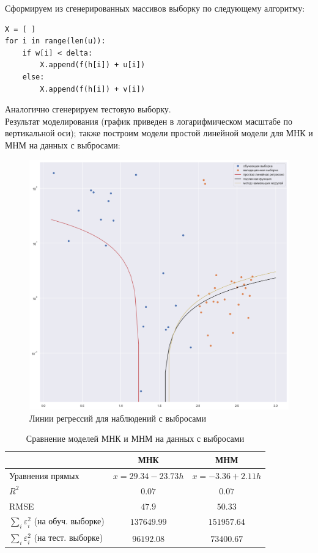 \documentclass[a4paper,12pt]{article}
\begin{document}
Сформируем из сгенерированных массивов выборку по следующему алгоритму:
\begin{verbatim}
X = [ ]
for i in range(len(u)):
    if w[i] < delta:
        X.append(f(h[i]) + u[i])
    else:
        X.append(f(h[i]) + v[i])
\end{verbatim}

Аналогично сгенерируем тестовую выборку.\\
Результат моделирования (график приведен в логарифмическом масштабе по вертикальной оси); также построим модели простой линейной модели для МНК и МНМ на данных с выбросами:

\begin{figure}[H]
    \centering
    \includegraphics[width=0.5\linewidth]{src/img/простая_линейная регрессия_с_выбросами.png}
    \caption{Линии регрессий для наблюдений с выбросами}
\end{figure}

\begin{table}[H]
    \begin{center}
        \begin{tabular}{|l|c|c|}
            \hline
            & МНК & МНМ \\ \hline
            Уравнения прямых & $x = 29.34 - 23.73 h$ & $x = -3.36 + 2.11 h$ \\ \hline
            $R^2$ & $0.07$ & $0.07$ \\ \hline
            RMSE & $47.9$ & $50.33$ \\ \hline
            $\sum\limits_i \varepsilon_i^2$ (на обуч. выборке) & $137649.99$ & $151957.64$ \\ \hline
            $\sum\limits_i \varepsilon_i^2$ (на тест. выборке) & $96192.08$ & $73400.67$ \\ \hline
        \end{tabular}
        \caption{Сравнение моделей МНК и МНМ на данных с выбросами}
    \end{center}
\end{table}
\end{document}
